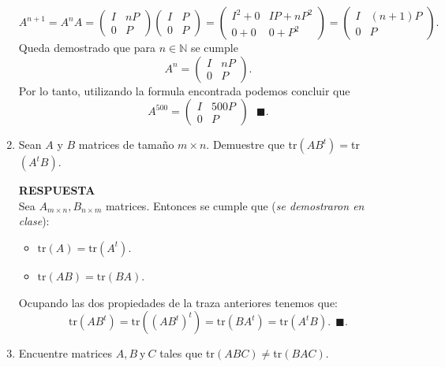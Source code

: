 \documentclass[11pt,letterpaper]{article}
\newcommand{\res}{\textbf{RESPUESTA}\\}
\newcommand{\finf}{\blacksquare.}
\newcommand{\tr}{\text{tr}}
\begin{document}
\begin{enumerate}
\begin{equation*}
A^{n+1}=A^nA=\left(\begin{array}{cc}
I& nP\\
0&P
\end{array}
\right)\left(\begin{array}{cc}
I& P\\
0&P
\end{array}
\right)=\left(\begin{array}{cc}
I^2+0& IP+nP^2\\
0+0&0+P^2
\end{array}
\right)=\left(\begin{array}{cc}
I&(n+1)P\\
0&P
\end{array}
\right).
\end{equation*}
Queda demostrado que para $n\in \mathbb{N}$ se cumple
\begin{equation*}
A^n= \left(\begin{array}{cc}
I&nP\\
0&P
\end{array}
\right).
\end{equation*}
Por lo tanto, utilizando la formula encontrada podemos concluir que 
\begin{equation*}
A^{500}=\left(\begin{array}{cc}
I& 500P\\
0&P
\end{array}
\right)\ \ \  \finf
\end{equation*}

\item Sean $A$ y $B$ matrices de tamaño $m\times n$. Demuestre que tr$(AB^t)=$tr$(A^tB)$. 

\res
Sea $A_{m\times n}, B_{n\times m}$ matrices. Entonces se cumple que (\textit{se demostraron en clase}):
\begin{itemize}
\item $\tr(A)=\tr(A^t).$
\item $\tr(AB)=\tr(BA)$.
\end{itemize}
Ocupando las dos propiedades de la traza anteriores tenemos que:
$$\tr(AB^t)=\tr((AB^t)^t)=\tr(BA^t)=\tr(A^tB). \ \ \finf$$
\item Encuentre matrices $A, B \ \text{y} \ C$ tales que tr$(ABC)\neq$tr$(BAC)$.


\end{enumerate}
\end{document}
